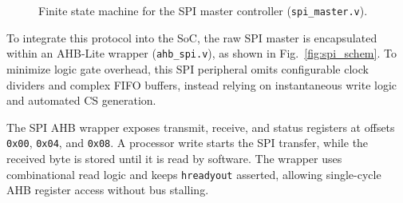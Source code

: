 \documentclass[runningheads]{llncs}
\begin{document}
\begin{figure}
\centering
{}
\caption{Finite state machine for the SPI master controller (\texttt{spi\_master.v}).}
\label{fig:spi_fsm}
\end{figure}

To integrate this protocol into the SoC, the raw SPI master is encapsulated within an AHB-Lite wrapper (\texttt{ahb\_spi.v}), as shown in Fig.~\ref{fig:spi_schem}. To minimize logic gate overhead, this SPI peripheral omits configurable clock dividers and complex FIFO buffers, instead relying on instantaneous write logic and automated CS generation.

The SPI AHB wrapper exposes transmit, receive, and status registers at offsets \texttt{0x00}, \texttt{0x04}, and \texttt{0x08}. A processor write starts the SPI transfer, while the received byte is stored until it is read by software. The wrapper uses combinational read logic and keeps \texttt{hreadyout} asserted, allowing single-cycle AHB register access without bus stalling.
\end{document}
